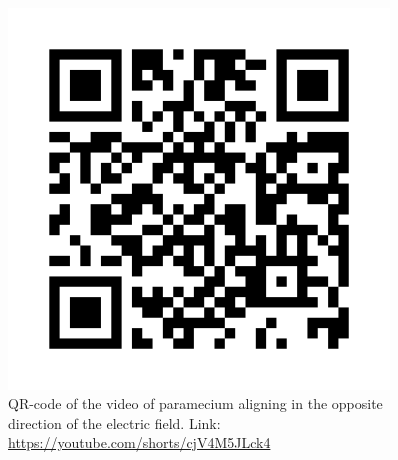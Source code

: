 \begin{minipage}{0.49\textwidth}
\begin{figure}[H]
\centering 
\captionsetup{width=0.98\linewidth, justification=centering}
\includegraphics[width=0.9\textwidth]{Figures/Paramecium_aligning.png}
\caption{QR-code of the video of paramecium aligning in the opposite direction of the electric field. Link: \url{https://youtube.com/shorts/cjV4M5JLck4}}
\label{fig:Paramecium_aligning}
\end{figure}
\end{minipage}
\hfill
